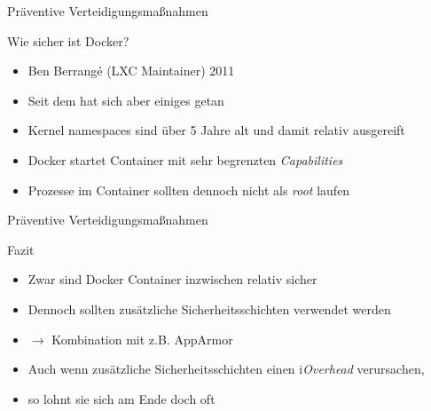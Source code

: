 \begin{frame}{Präventive Verteidigungsmaßnahmen}
        \begin{block}{Wie sicher ist Docker?}
                \begin{itemize}[<+->]
                        \item {} Ben Berrangé (LXC Maintainer) 2011\footnotemark
                        \item Seit dem hat sich aber einiges getan
                        \item Kernel namespaces sind über 5 Jahre alt und damit relativ ausgereift
                        \item Docker startet Container mit sehr begrenzten \textit{Capabilities}
                        \item Prozesse im Container sollten dennoch nicht als \textit{root} laufen
                \end{itemize}
        \end{block}

\end{frame}

\begin{frame}{Präventive Verteidigungsmaßnahmen}
        \begin{block}{Fazit}
                \begin{itemize}[<+->]
                        \item Zwar sind Docker Container inzwischen relativ sicher
                        \item Dennoch sollten zusätzliche Sicherheitsschichten verwendet werden
                        \item $\rightarrow$ Kombination mit z.B. AppArmor
                        \item Auch wenn zusätzliche Sicherheitsschichten einen i\textit{Overhead} verursachen,
                        \item so lohnt sie sich am Ende doch oft 
                \end{itemize}
        \end{block}
\end{frame}

